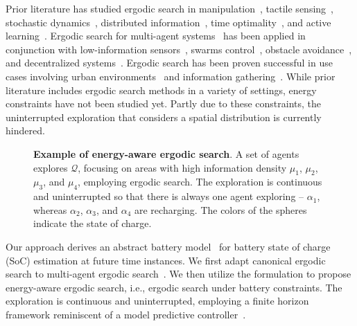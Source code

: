 \documentclass[letterpaper,10pt,conference,twoside]{IEEEtran}
\theoremstyle{definition}
\begin{document}
Prior literature has studied ergodic search in manipulation~\cite{shetty2022ergodic}, tactile sensing~\cite{abraham2017ergodic}, stochastic dynamics~\cite{ayvali2017ergodic,torre2016ergodic}, distributed information~\cite{miller2016ergodic}, time optimality~\cite{dong2023time}, and active learning~\cite{abraham2021ergodic}. Ergodic search for multi-agent systems~\cite{prabhakar2020ergodic,coffin2022multi} has been applied in conjunction with low-information sensors~\cite{coffin2022multi,lerch2023safety,abraham2018decentralized}, swarms control~\cite{prabhakar2020ergodic}, obstacle avoidance~\cite{lerch2023safety}, and decentralized systems~\cite{abraham2018decentralized}. Ergodic search has been proven successful in use cases involving urban environments~\cite{patel2021multi} and information gathering~\cite{dressel2018optimality}.
While prior literature includes ergodic search methods in a variety of settings, energy constraints have not been studied yet. 
Partly due to these constraints, the uninterrupted exploration %
that %
considers a spatial distribution is currently hindered. 

\begin{figure}[t!]
  \centering
  \vspace*{-.1cm}
  
  \caption{\textbf{Example of energy-aware ergodic search}. A set of agents explores $\mathcal{Q}$, focusing on areas with high information density $\mu_1$, $\mu_2$, $\mu_3$, and $\mu_4$, employing ergodic search. The exploration is continuous and uninterrupted %
  so that there is always one agent exploring -- $\alpha_1$, whereas $\alpha_2$, $\alpha_3$, and $\alpha_4$ are recharging. The colors of the spheres indicate the state of charge.}
  \label{fig:abs}
  \vspace*{-.4cm}
\end{figure}

Our approach derives an abstract battery model~\cite{zhao2017observability} for battery state of charge (SoC) estimation at future time instances. We first adapt canonical ergodic search to multi-agent ergodic search~\cite{prabhakar2020ergodic,coffin2022multi}. We then utilize the formulation to propose energy-aware ergodic search, i.e., ergodic search under battery constraints. The exploration is continuous and uninterrupted, employing a finite horizon framework reminiscent of a model predictive controller~\cite{seewald2022energy}. %
\end{document}
